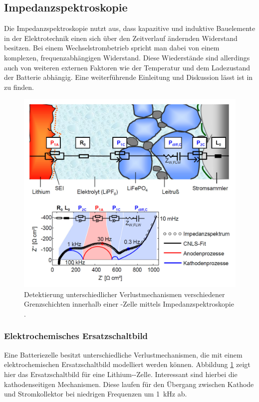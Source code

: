 \documentclass[a4paper, 11pt, headsepline,footsepline,twoside,abstract]{scrbook}
\begin{document}
\subsection{Impedanzspektroskopie}
Die Impedanzspektroskopie nutzt aus, dass kapazitive und induktive Bauelemente in der Elektrotechnik einen sich über den Zeitverlauf ändernden Widerstand besitzen. Bei einem Wechselstrombetrieb spricht man dabei von einem komplexen, frequenzabhängigen Widerstand. Diese Wiederstände sind allerdings auch von weiteren externen Faktoren wie der Temperatur und dem Ladezustand der Batterie abhängig. Eine weiterführende Einleitung und Diskussion lässt ist in \cite{schmidt2013verfahren} zu finden.
\begin{figure}[h]
	\centering
	\includegraphics[width=1.0\columnwidth]{images/Schema_IS.jpg}
	\caption{Detektierung unterschiedlicher Verlustmechanismen verschiedener Grenzschichten innerhalb einer -Zelle mittels Impedanzspektroskopie \cite{bub_skript}.}
	\label{schema_is}
\end{figure}
\subsubsection{Elektrochemisches Ersatzschaltbild}
Eine Batteriezelle besitzt unterschiedliche Verlustmechanismen, die mit einem elektrochemischen Ersatzschaltbild modelliert werden können. Abbildung \ref{schema_is} zeigt hier das Ersatzschaltbild für eine Lithium--Zelle. Interessant sind hierbei die kathodenseitigen Mechanismen. Diese laufen für den Übergang zwischen Kathode und Stromkollektor bei niedrigen Frequenzen um \SI{1}{\kilo\hertz} ab.
\end{document}
